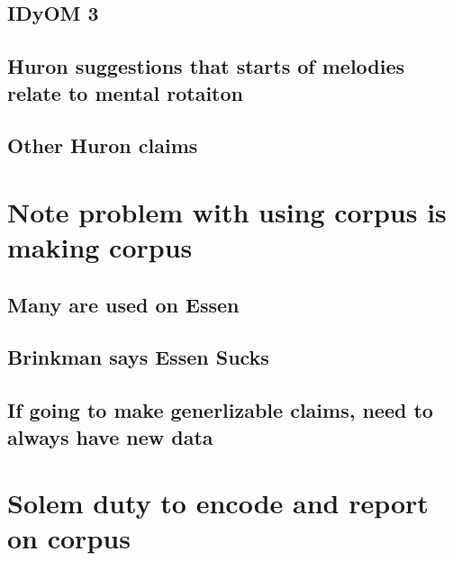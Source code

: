 \documentclass[]{book}
\begin{document}
\hypertarget{idyom-3}{%
\subsection{IDyOM 3}\label{idyom-3}}

\hypertarget{huron-suggestions-that-starts-of-melodies-relate-to-mental-rotaiton}{%
\subsection{Huron suggestions that starts of melodies relate to mental rotaiton}\label{huron-suggestions-that-starts-of-melodies-relate-to-mental-rotaiton}}

\hypertarget{other-huron-claims}{%
\subsection{Other Huron claims}\label{other-huron-claims}}

\hypertarget{note-problem-with-using-corpus-is-making-corpus}{%
\section{Note problem with using corpus is making corpus}\label{note-problem-with-using-corpus-is-making-corpus}}

\hypertarget{many-are-used-on-essen}{%
\subsection{Many are used on Essen}\label{many-are-used-on-essen}}

\hypertarget{brinkman-says-essen-sucks}{%
\subsection{Brinkman says Essen Sucks}\label{brinkman-says-essen-sucks}}

\hypertarget{if-going-to-make-generlizable-claims-need-to-always-have-new-data}{%
\subsection{If going to make generlizable claims, need to always have new data}\label{if-going-to-make-generlizable-claims-need-to-always-have-new-data}}

\hypertarget{solem-duty-to-encode-and-report-on-corpus}{%
\section{Solem duty to encode and report on corpus}\label{solem-duty-to-encode-and-report-on-corpus}}
\end{document}
